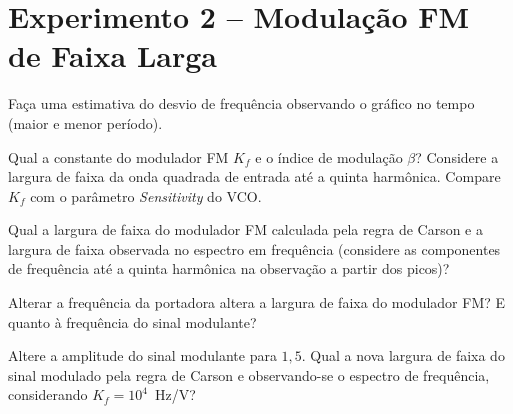 \documentclass[12pt,addpoints]{exam}
\begin{document}
\section*{Experimento 2 -- Modulação FM de Faixa Larga}

\begin{questions}
    \question Faça uma estimativa do desvio de frequência observando o gráfico no tempo (maior e menor período). 
    \fillwithlines{0.25in}
    
    \question Qual a constante do modulador FM $K_{f}$ e o índice de modulação $\beta$? Considere a largura de faixa da onda quadrada de entrada até a quinta harmônica. Compare $K_{f}$ com o parâmetro {\it Sensitivity} do VCO.
    \fillwithlines{0.5in}
    
    \question Qual a largura de faixa do modulador FM calculada pela regra de Carson e a largura de faixa observada no espectro em frequência (considere as componentes de frequência até a quinta harmônica na observação a partir dos picos)?%
    \fillwithlines{0.25in}
    
    \question Alterar a frequência da portadora altera a largura de faixa do modulador FM? E quanto à frequência do sinal modulante?
    \fillwithlines{0.5in}
    
    \question Altere a amplitude do sinal modulante para $1,5$. Qual a nova largura de faixa do sinal modulado pela regra de Carson e observando-se o espectro de frequência, considerando $K_{f} = 10^{4}$~Hz/V?
    \fillwithlines{0.25in}
    
\end{questions}

%
%    
\end{document}
